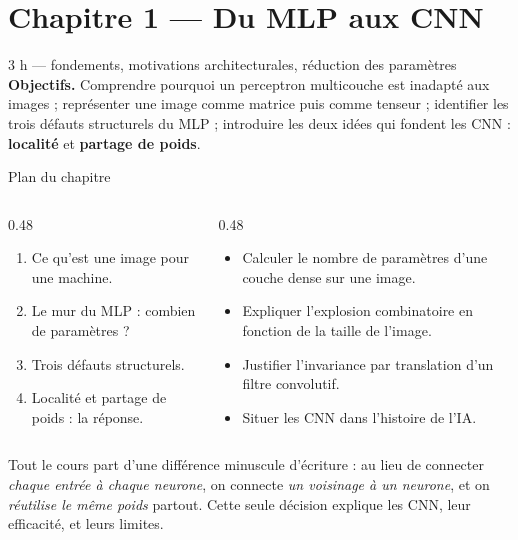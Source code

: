 \section{Chapitre 1 --- Du MLP aux CNN}

%
{3 h --- fondements, motivations architecturales, réduction des paramètres}%
{\textbf{Objectifs.} Comprendre pourquoi un perceptron multicouche est inadapté aux images ;
représenter une image comme matrice puis comme tenseur ; identifier les trois défauts
structurels du MLP ; introduire les deux idées qui fondent les CNN : \textbf{localité} et
\textbf{partage de poids}.}

\begin{frame}{Plan du chapitre}
\begin{columns}[t]
\begin{column}{0.48\textwidth}
\begin{kbox}
\begin{enumerate}
  \item Ce qu'est une image pour une machine.
  \item Le mur du MLP : combien de paramètres ?
  \item Trois défauts structurels.
  \item Localité et partage de poids : la réponse.
\end{enumerate}
\end{kbox}
\end{column}
\begin{column}{0.48\textwidth}
\begin{ebox}
\begin{itemize}
  \item Calculer le nombre de paramètres d'une couche dense sur une image.
  \item Expliquer l'explosion combinatoire en fonction de la taille de l'image.
  \item Justifier l'invariance par translation d'un filtre convolutif.
  \item Situer les CNN dans l'histoire de l'IA.
\end{itemize}
\end{ebox}
\end{column}
\end{columns}
\vspace{1mm}
\begin{wbox}
Tout le cours part d'une différence minuscule d'écriture : au lieu de connecter
\emph{chaque entrée à chaque neurone}, on connecte \emph{un voisinage à un neurone},
et on \emph{réutilise le même poids} partout. Cette seule décision explique les CNN,
leur efficacité, et leurs limites.
\end{wbox}
\end{frame}

